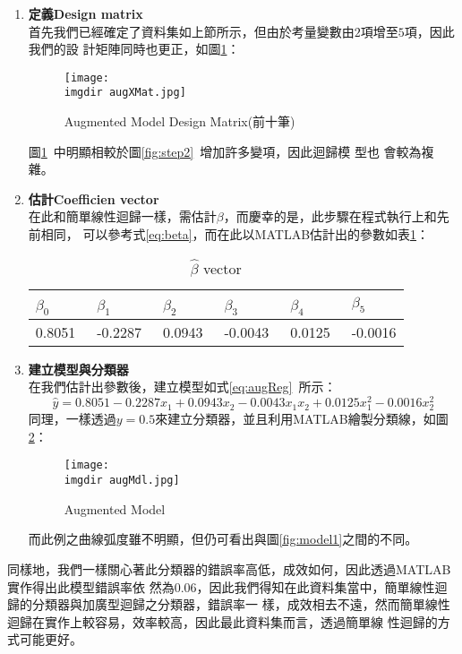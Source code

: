 		\begin{enumerate}[Step 1：]			
			\item {\textbf{定義Design matrix}\\
				首先我們已經確定了資料集如上節所示，但由於考量變數由$2$項增至$5$項，因此我們的設					計矩陣同時也更正，如圖\ref{fig:augXMat}：
				\begin{figure}[H]	
		 		 	\centering	 			 	 
   				 	\texttt{[image: \\imgdir augXMat.jpg]} 
   			 		\caption{Augmented Model Design Matrix(前十筆)}   		
   			 		\label{fig:augXMat}   			 		 
				\end{figure}
				圖\ref{fig:augXMat}\ 中明顯相較於圖\ref{fig:step2}\ 增加許多變項，因此迴歸模					型也	會較為複雜。
			}
			\item {\textbf{估計Coefficien vector}\\
				在此和簡單線性迴歸一樣，需估計$\beta$，而慶幸的是，此步驟在程式執行上和先前相同，					可以參考式\ref{eq:beta}，而在此以MATLAB估計出的參數如表\ref{table:beta}：
				\begin{table}[h]				
					\caption{$\hat{\beta}$ vector}\label{table:beta}
					\centering
					\extrarowheight=8pt
					\begin{tabular}{llllll} 					
					\hline
					$\beta_0$\ &$\beta_1$ \ &$\beta_2$ \ &$\beta_3$ \ &$\beta_4$ \ &$						\beta_5$ \\ \hline	
					0.8051\ & -0.2287\ & 0.0943\ & -0.0043\ & 0.0125\ &-0.0016 \\
					\hline					
					\end{tabular}
				\end{table}
			}
			\item {\textbf{建立模型與分類器}\\
				在我們估計出參數後，建立模型如式\ref{eq:augReg}\ 所示：
				\begin{equation}\label{eq:augReg}
					\hat{y} = 0.8051-0.2287x_1+0.0943x_2-0.0043x_1 											x_2+0.0125x_1^2-0.0016x_2^2
				\end{equation}
				同理，一樣透過$y=0.5$來建立分類器，並且利用MATLAB繪製分類線，如圖								\ref{fig:augMdl}：
				\begin{figure}[H]	
		 		 	\centering	 			 	 
   				 	\texttt{[image: \\imgdir augMdl.jpg]} 
   			 		\caption{Augmented Model}   		
   			 		\label{fig:augMdl}   			 		 
				\end{figure}
				而此例之曲線弧度雖不明顯，但仍可看出與圖\ref{fig:model1}之間的不同。			
			}
		\end{enumerate}
		同樣地，我們一樣關心著此分類器的錯誤率高低，成效如何，因此透過MATLAB實作得出此模型錯誤率依			然為$0.06$，因此我們得知在此資料集當中，簡單線性迴歸的分類器與加廣型迴歸之分類器，錯誤率一			樣，成效相去不遠，然而簡單線性迴歸在實作上較容易，效率較高，因此最此資料集而言，透過簡單線			性迴歸的方式可能更好。
